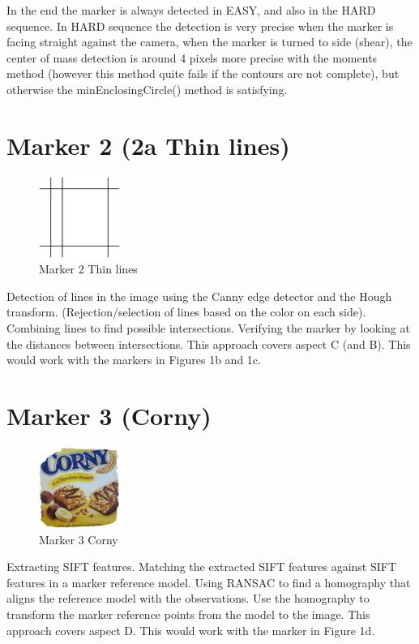In the end the marker is always detected in EASY, and also in the HARD sequence. In HARD sequence the detection is very precise when
the marker is facing straight against the camera, when the marker is turned to side (shear), the center of mass detection is around 4 pixels more precise with the moments method (however this method quite fails if the contours are not complete), but otherwise the minEnclosingCircle() method is satisfying.


\newpage
\section{Marker 2 (2a Thin lines)}

\begin{figure}[ht!]
	\centering
	\includegraphics[width=100px]{figures/Marker2a}
	\caption{Marker 2 Thin lines}
	\label{fig:markerLines}
\end{figure}

Detection of lines in the image using the Canny edge detector and the
Hough transform. (Rejection/selection of lines based on the color on
each side). Combining lines to find possible intersections. Verifying
the marker by looking at the distances between intersections. This
approach covers aspect C (and B). This would work with the markers
in Figures 1b and 1c.



\newpage
\section{Marker 3 (Corny)}

\begin{figure}[ht!]
	\centering
	\includegraphics[width=100px]{figures/Marker3}
	\caption{Marker 3 Corny}
	\label{fig:markerColor}
\end{figure}


Extracting SIFT features. Matching the extracted SIFT features against
SIFT features in a marker reference model. Using RANSAC to find
a homography that aligns the reference model with the observations.
Use the homography to transform the marker reference points from
the model to the image. This approach covers aspect D. This would
work with the marker in Figure 1d.
